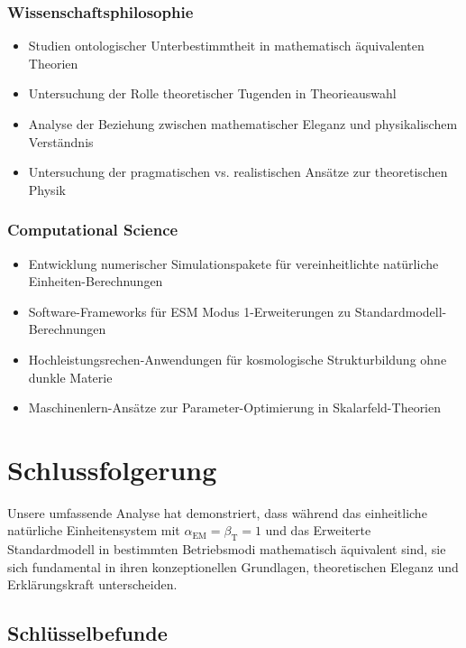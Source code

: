 \documentclass[12pt,a4paper]{article}
\newcommand{\alphaEM}{\alpha_{\text{EM}}}
\newcommand{\betaT}{\beta_{\text{T}}}
\begin{document}
	\subsubsection{Wissenschaftsphilosophie}
	\label{subsubsec:philosophy_science}
	
	\begin{itemize}
		\item Studien ontologischer Unterbestimmtheit in mathematisch äquivalenten Theorien
		\item Untersuchung der Rolle theoretischer Tugenden in Theorieauswahl
		\item Analyse der Beziehung zwischen mathematischer Eleganz und physikalischem Verständnis
		\item Untersuchung der pragmatischen vs. realistischen Ansätze zur theoretischen Physik
	\end{itemize}
	
	\subsubsection{Computational Science}
	\label{subsubsec:computational_science}
	
	\begin{itemize}
		\item Entwicklung numerischer Simulationspakete für vereinheitlichte natürliche Einheiten-Berechnungen
		\item Software-Frameworks für ESM Modus 1-Erweiterungen zu Standardmodell-Berechnungen
		\item Hochleistungsrechen-Anwendungen für kosmologische Strukturbildung ohne dunkle Materie
		\item Maschinenlern-Ansätze zur Parameter-Optimierung in Skalarfeld-Theorien
	\end{itemize}
	
	\section{Schlussfolgerung}
	\label{sec:conclusion}
	
	Unsere umfassende Analyse hat demonstriert, dass während das einheitliche natürliche Einheitensystem mit $\alphaEM = \betaT = 1$ und das Erweiterte Standardmodell in bestimmten Betriebsmodi mathematisch äquivalent sind, sie sich fundamental in ihren konzeptionellen Grundlagen, theoretischen Eleganz und Erklärungskraft unterscheiden.
	
	\subsection{Schlüsselbefunde}
	\label{subsec:key_findings}
	
\end{document}
